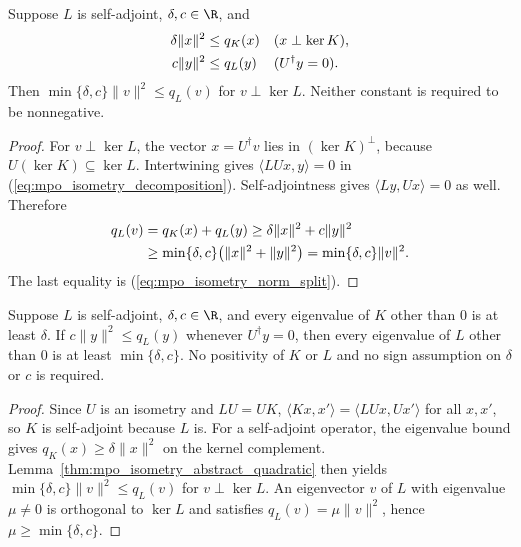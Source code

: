 \begin{lemma}
    \label{thm:mpo_isometry_abstract_quadratic}
    \leanok
    Suppose $L$ is self-adjoint, $\delta,c\in\R$, and
    \begin{align}
        \delta\|x\|^2 & \leq q_K(x)
                      &             & (x\perp\ker K),\notag  \\
        c\|y\|^2      & \leq q_L(y)
                      &             & (U^\dagger y=0).\notag
    \end{align}
    Then $\min\{\delta,c\}\|v\|^2\leq q_L(v)$ for
    $v\perp\ker L$. Neither constant is required to be nonnegative.
\end{lemma}
\begin{proof}\leanok
    For $v\perp\ker L$, the vector $x=U^\dagger v$ lies in
    $(\ker K)^\perp$, because $U(\ker K)\subseteq\ker L$.
    Intertwining gives $\langle LUx,y\rangle=0$ in
    (\ref{eq:mpo_isometry_decomposition}). Self-adjointness gives
    $\langle Ly,Ux\rangle=0$ as well. Therefore
    \begin{align}
        q_L(v) & =q_K(x)+q_L(y)
        \geq\delta\|x\|^2+c\|y\|^2\notag                         \\
               & \geq\min\{\delta,c\}\bigl(\|x\|^2+\|y\|^2\bigr)
        =\min\{\delta,c\}\|v\|^2.\notag
    \end{align}
    The last equality is (\ref{eq:mpo_isometry_norm_split}).
\end{proof}

\begin{lemma}
    \label{thm:mpo_isometry_abstract_norm}
    \leanok
    Suppose $L$ is self-adjoint, $\delta,c\in\R$, and every eigenvalue
    of $K$ other than $0$ is at least $\delta$.
    If $c\|y\|^2\leq q_L(y)$ whenever $U^\dagger y=0$, then every
    eigenvalue of $L$ other than $0$ is at least $\min\{\delta,c\}$.
    No positivity of $K$ or $L$ and no sign assumption on $\delta$ or $c$
    is required.
\end{lemma}
\begin{proof}\leanok
    Since $U$ is an isometry and $LU=UK$,
    $\langle Kx,x'\rangle=\langle LUx,Ux'\rangle$ for all $x,x'$, so $K$
    is self-adjoint because $L$ is. For a self-adjoint operator, the
    eigenvalue bound gives $q_K(x)\geq\delta\|x\|^2$ on the kernel
    complement. Lemma~\ref{thm:mpo_isometry_abstract_quadratic} then yields
    $\min\{\delta,c\}\|v\|^2\leq q_L(v)$ for $v\perp\ker L$.
    An eigenvector $v$ of $L$ with eigenvalue $\mu\neq0$ is orthogonal to
    $\ker L$ and satisfies $q_L(v)=\mu\|v\|^2$, hence
    $\mu\geq\min\{\delta,c\}$.
\end{proof}

